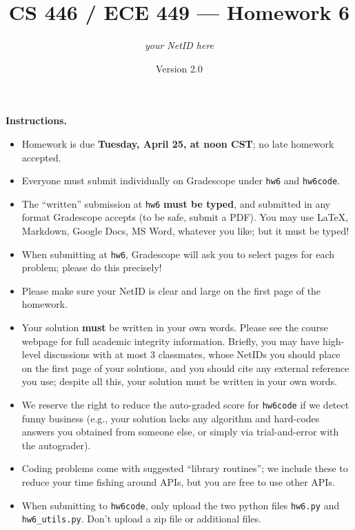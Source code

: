 \documentclass{article}
\title{CS 446 / ECE 449 --- Homework 6}
\author{\emph{your NetID here}}
\date{Version 2.0}
\theoremstyle{definition}
\theoremstyle{remark}
\begin{document}
\maketitle

\noindent\textbf{Instructions.}
\begin{itemize}
  \item
    Homework is due \textbf{Tuesday, April 25, at noon CST}; no late homework accepted.

  \item
    Everyone must submit individually on Gradescope under \texttt{hw6} and \texttt{hw6code}.

  \item
    The ``written'' submission at \texttt{hw6} \textbf{must be typed}, and submitted in
    any format Gradescope accepts (to be safe, submit a PDF).  You may use \LaTeX, Markdown,
    Google Docs, MS Word, whatever you like; but it must be typed!

  \item
    When submitting at \texttt{hw6}, Gradescope will ask you to select pages
    for each problem; please do this precisely!

  \item
    Please make sure your NetID is clear and large on the first page of the homework.

  \item
    Your solution \textbf{must} be written in your own words.
    Please see the course webpage for full academic integrity information.
    Briefly, you may have high-level discussions with at most 3 classmates,
    whose NetIDs you should place on the first page of your solutions,
    and you should cite any external reference you use; despite all this,
    your solution must be written in your own words.

    \item
      We reserve the right to reduce the auto-graded score for
      \texttt{hw6code} if we detect funny business (e.g., your solution
      lacks any algorithm and hard-codes answers you obtained from
      someone else, or simply via trial-and-error with the autograder).

    \item
      Coding problems come with suggested ``library routines''; we include these to reduce
      your time fishing around APIs, but you are free to use other APIs.

    \item
      When submitting to \texttt{hw6code}, only upload the two python files \texttt{hw6.py} and \texttt{hw6\_utils.py}. Don't upload a zip file or additional files.
    
\end{itemize}
\end{document}
